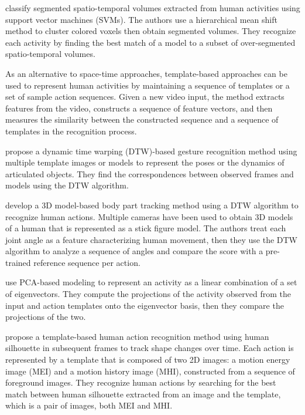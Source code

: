  classify segmented spatio-temporal volumes
extracted from human activities using support vector machines (SVMs). The
authors use a hierarchical mean shift method to cluster colored voxels then
obtain segmented volumes. They recognize each activity by finding the best
match of a model to a subset of over-segmented spatio-temporal volumes.

As an alternative to space-time approaches, template-based approaches can be
used to represent human activities by maintaining a sequence of templates or a
set of sample action sequences. Given a new video input, the method extracts
features from the video, constructs a sequence of feature vectors, and then
measures the similarity between the constructed sequence and a sequence of
templates in the recognition process. 

 propose a dynamic time warping (DTW)-based
gesture recognition method using multiple template images or models to
represent the poses or the dynamics of articulated objects. They find the
correspondences between observed frames and models using the DTW algorithm.

 develop a 3D model-based body part tracking
method using a DTW algorithm to recognize human actions.  Multiple cameras have
been used to obtain 3D models of a human that is represented as a stick figure
model. The authors treat each joint angle as a feature characterizing human
movement, then they use the DTW algorithm to analyze a sequence of angles and
compare the score with a pre-trained reference sequence per action.

 use PCA-based modeling to represent an
activity as a linear combination of a set of eigenvectors. They compute the
projections of the activity observed from the input and action templates onto
the eigenvector basis, then they compare the projections of the two.

 propose a template-based human action
recognition method using human silhouette in subsequent frames to track shape
changes over time.  Each action is represented by a template that is composed
of two 2D images: a motion energy image (MEI) and a motion history image (MHI),
constructed from a sequence of foreground images. They recognize human actions
by searching for the best match between human silhouette extracted from an
image and the template, which is a pair of images, both MEI and MHI.

